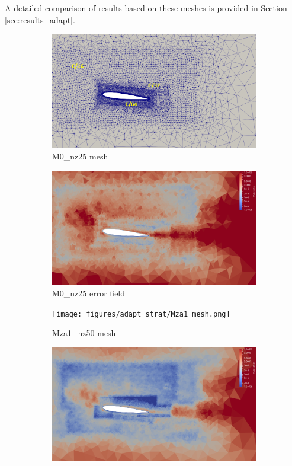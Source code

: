 A detailed comparison of results based on these meshes is provided in Section \ref{sec:results_adapt}.

\begin{figure}[H]
\centering
\begin{subfigure}[b]{0.475\textwidth}
\centering
\includegraphics[width=1\textwidth]{figures/adapt_strat/M0_mesh.png}
\caption{M0\_nz25 mesh}
\label{fig:M0_mesh}
\end{subfigure}
\begin{subfigure}[b]{0.475\textwidth}
\centering
\includegraphics[width=1\textwidth]{figures/adapt_strat/M0_error_plot.png}
\caption{M0\_nz25 error field}
\label{fig:M0_err_plot}
\end{subfigure}
\begin{subfigure}[b]{0.475\textwidth}
\centering
\texttt{[image: figures/adapt\_strat/Mza1\_mesh.png]}
\caption{Mza1\_nz50 mesh}
\label{fig:Mza1_mesh}
\end{subfigure}
\begin{subfigure}[b]{0.475\textwidth}
\centering
\includegraphics[width=1\textwidth]{figures/adapt_strat/Mza1_error_plot.png}

\end{subfigure}
\end{figure}
